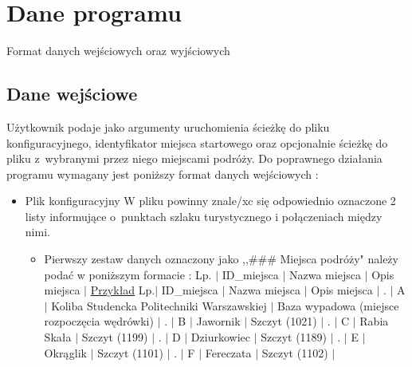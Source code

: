 \documentclass[10pt,oneside]{article}
\begin{document}
\section{Dane programu}
Format danych wejściowych oraz wyjściowych
\subsection{Dane wejściowe}
Użytkownik podaje jako argumenty uruchomienia ścieżkę do pliku konfiguracyjnego, identyfikator miejsca startowego oraz opcjonalnie ścieżkę do pliku z~wybranymi przez niego miejscami podróży.
Do poprawnego działania programu wymagany jest poniższy format danych wejściowych :
\begin{itemize}
	\item Plik konfiguracyjny \newline W pliku powinny znale/xc się odpowiednio oznaczone 2 listy informujące o~punktach szlaku turystycznego i połączeniach między nimi.
	\begin{itemize}
		\item Pierwszy zestaw danych oznaczony jako ,,\#\#\# Miejsca podróży" należy podać w poniższym formacie : \newline
		Lp. $\vert$ ID\_miejsca $\vert$ Nazwa miejsca $\vert$ Opis miejsca $\vert$
		\newline \newline
		\underline{Przykład}
		\newline \newline
		Lp.$\vert$ ID\_miejsca $\vert$ Nazwa miejsca $\vert$ Opis miejsca $\vert$ . $\vert$ A $\vert$ Koliba Studencka Politechniki Warszawskiej $\vert$ Baza wypadowa (miejsce rozpoczęcia wędrówki) $\vert$ . $\vert$ B $\vert$ Jawornik $\vert$ Szczyt (1021) $\vert$ . $\vert$ C $\vert$ Rabia Skała $\vert$ Szczyt (1199) $\vert$ . $\vert$ D $\vert$ Dziurkowiec $\vert$ Szczyt (1189) $\vert$ . $\vert$ E $\vert$ Okrąglik $\vert$ Szczyt (1101) $\vert$ . $\vert$ F $\vert$ Fereczata $\vert$ Szczyt (1102) $\vert$ \newline
		

\end{itemize}
\end{itemize}
\end{document}

